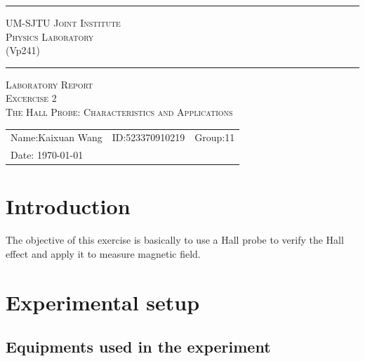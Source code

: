 \documentclass[12pt, a4paper, oneside]{article}
\begin{document}
\begin{center}
	\rule{\textwidth}{1pt}\par
	\vspace{5mm}
	{\large\scshape UM-SJTU Joint Institute}\\[\baselineskip]
	{\large\scshape Physics Laboratory}\\
	(Vp241)
	\rule{\textwidth}{1pt}\par
	\vspace{4cm}
	{\large\scshape Laboratory Report}\\[\baselineskip]
	{\large\scshape Excercise 2}\\[\baselineskip]
	{\large\scshape The Hall Probe: Characteristics and Applications}\\[\baselineskip]
\end{center}
\vspace{7cm}

\begin{tabular}{lll}
	Name:Kaixuan Wang & ID:523370910219 & Group:11 \\
	Date: {\today}    &                 &         \\
\end{tabular}


\rightline{\footnotesize[rev4.1]}
\pagebreak

\section{Introduction}
\indent

The objective of this exercise is basically to use a Hall probe to verify the Hall effect and apply it to measure
magnetic field.

\section{Experimental setup}
\indent

\subsection{Equipments used in the experiment}
\indent
\end{document}
